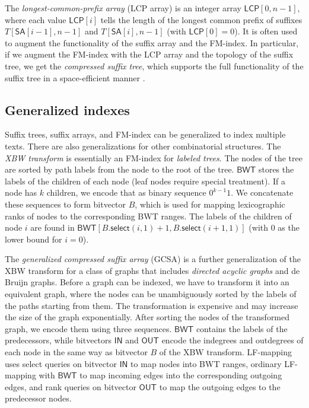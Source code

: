 \documentclass[a4paper,UKenglish]{lipics-v2016}
\newcommand{\select}{\ensuremath{\mathsf{select}}}
\newcommand{\LFmapping}{LF\nobreakdash-mapping}
\newcommand{\FMindex}{FM\nobreakdash-index}
\newcommand{\SA}{\ensuremath{\mathsf{SA}}}
\newcommand{\BWT}{\ensuremath{\mathsf{BWT}}}
\newcommand{\LCP}{\ensuremath{\mathsf{LCP}}}
\newcommand{\bvIN}{\ensuremath{\mathsf{IN}}}
\newcommand{\bvOUT}{\ensuremath{\mathsf{OUT}}}
\begin{document}
The \emph{longest-common-prefix array} (LCP array) \cite{Manber1993} is an integer array $\LCP[0, n-1]$, where each value $\LCP[i]$ tells the length of the longest common prefix of suffixes $T[\SA[i-1], n-1]$ and $T[\SA[i], n-1]$ (with $\LCP[0] = 0$). It is often used to augment the functionality of the suffix array and the \FMindex. In particular, if we augment the \FMindex{} with the LCP array and the topology of the suffix tree, we get the \emph{compressed suffix tree}, which supports the full functionality of the suffix tree in a space-efficient manner \cite{Sadakane2007}.

\subsection{Generalized indexes}

Suffix trees, suffix arrays, and \FMindex{} can be generalized to index multiple texts. There are also generalizations for other combinatorial structures. The \emph{XBW transform} \cite{Ferragina2009b} is essentially an \FMindex{} for \emph{labeled trees}. The nodes of the tree are sorted by path labels from the node to the root of the tree. $\BWT$ stores the labels of the children of each node (leaf nodes require special treatment). If a node has $k$ children, we encode that as binary sequence $0^{k-1} 1$. We concatenate these sequences to form bitvector $B$, which is used for mapping lexicographic ranks of nodes to the corresponding BWT ranges. The labels of the children of node $i$ are found in $\BWT[B.\select(i, 1) + 1, B.\select(i + 1, 1)]$ (with $0$ as the lower bound for $i = 0$).

The \emph{generalized compressed suffix array} (GCSA) \cite{Siren2014} is a further generalization of the XBW transform for a class of graphs that includes \emph{directed acyclic graphs} and de Bruijn graphs. Before a graph can be indexed, we have to transform it into an equivalent graph, where the nodes can be unambiguously sorted by the labels of the paths starting from them. The transformation is expensive and may increase the size of the graph exponentially. After sorting the nodes of the transformed graph, we encode them using three sequences. $\BWT$ contains the labels of the predecessors, while bitvectors $\bvIN$ and $\bvOUT$ encode the indegrees and outdegrees of each node in the same way as bitvector $B$ of the XBW transform. \LFmapping{} uses select queries on bitvector $\bvIN$ to map nodes into BWT ranges, ordinary \LFmapping{} with $\BWT$ to map incoming edges into the corresponding outgoing edges, and rank queries on bitvector $\bvOUT$ to map the outgoing edges to the predecessor nodes.
\end{document}
